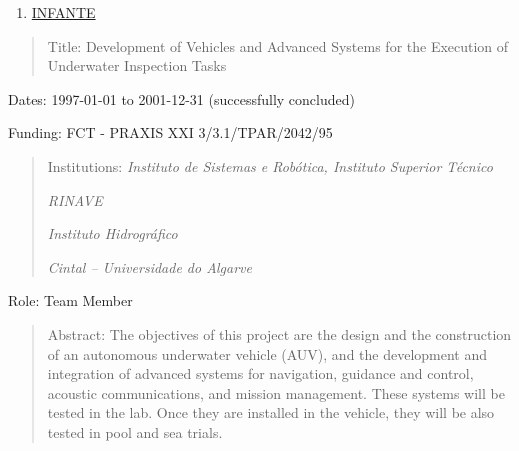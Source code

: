 \begin{enumerate}
\def\labelenumi{\arabic{enumi}.}
\setcounter{enumi}{21}
\item
  \ul{INFANTE}
\end{enumerate}

\begin{quote}
Title: Development of Vehicles and Advanced Systems for the Execution of
Underwater Inspection Tasks
\end{quote}

Dates: 1997-01-01 to 2001-12-31 (successfully concluded)

Funding: FCT - PRAXIS XXI 3/3.1/TPAR/2042/95

\begin{quote}
Institutions: \emph{Instituto de Sistemas e Robótica, Instituto Superior
Técnico}

\emph{RINAVE}

\emph{Instituto Hidrográfico}

\emph{Cintal -- Universidade do Algarve}
\end{quote}

Role: Team Member

\begin{quote}
Abstract: The objectives of this project are the design and the
construction of an autonomous underwater vehicle (AUV), and the
development and integration of advanced systems for navigation, guidance
and control, acoustic communications, and mission management. These
systems will be tested in the lab. Once they are installed in the
vehicle, they will be also tested in pool and sea trials.
\end{quote}
